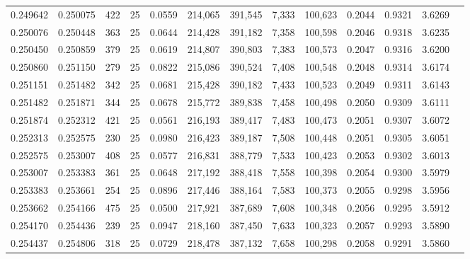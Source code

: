 \begin{tabular}{rrrrrrrrrrrrr}
0.249642 & 0.250075 &   422 &  25 &                                     0.0559 & 214,065 & 391,545 &   7,333 & 100,623 & 0.2044 & 0.9321 & 3.6269 \\
0.250076 & 0.250448 &   363 &  25 &                                     0.0644 & 214,428 & 391,182 &   7,358 & 100,598 & 0.2046 & 0.9318 & 3.6235 \\
0.250450 & 0.250859 &   379 &  25 &                                     0.0619 & 214,807 & 390,803 &   7,383 & 100,573 & 0.2047 & 0.9316 & 3.6200 \\
0.250860 & 0.251150 &   279 &  25 &                                     0.0822 & 215,086 & 390,524 &   7,408 & 100,548 & 0.2048 & 0.9314 & 3.6174 \\
0.251151 & 0.251482 &   342 &  25 &                                     0.0681 & 215,428 & 390,182 &   7,433 & 100,523 & 0.2049 & 0.9311 & 3.6143 \\
0.251482 & 0.251871 &   344 &  25 &                                     0.0678 & 215,772 & 389,838 &   7,458 & 100,498 & 0.2050 & 0.9309 & 3.6111 \\
0.251874 & 0.252312 &   421 &  25 &                                     0.0561 & 216,193 & 389,417 &   7,483 & 100,473 & 0.2051 & 0.9307 & 3.6072 \\
0.252313 & 0.252575 &   230 &  25 &                                     0.0980 & 216,423 & 389,187 &   7,508 & 100,448 & 0.2051 & 0.9305 & 3.6051 \\
0.252575 & 0.253007 &   408 &  25 &                                     0.0577 & 216,831 & 388,779 &   7,533 & 100,423 & 0.2053 & 0.9302 & 3.6013 \\
0.253007 & 0.253383 &   361 &  25 &                                     0.0648 & 217,192 & 388,418 &   7,558 & 100,398 & 0.2054 & 0.9300 & 3.5979 \\
0.253383 & 0.253661 &   254 &  25 &                                     0.0896 & 217,446 & 388,164 &   7,583 & 100,373 & 0.2055 & 0.9298 & 3.5956 \\
0.253662 & 0.254166 &   475 &  25 &                                     0.0500 & 217,921 & 387,689 &   7,608 & 100,348 & 0.2056 & 0.9295 & 3.5912 \\
0.254170 & 0.254436 &   239 &  25 &                                     0.0947 & 218,160 & 387,450 &   7,633 & 100,323 & 0.2057 & 0.9293 & 3.5890 \\
0.254437 & 0.254806 &   318 &  25 &                                     0.0729 & 218,478 & 387,132 &   7,658 & 100,298 & 0.2058 & 0.9291 & 3.5860 \\

\end{tabular}
